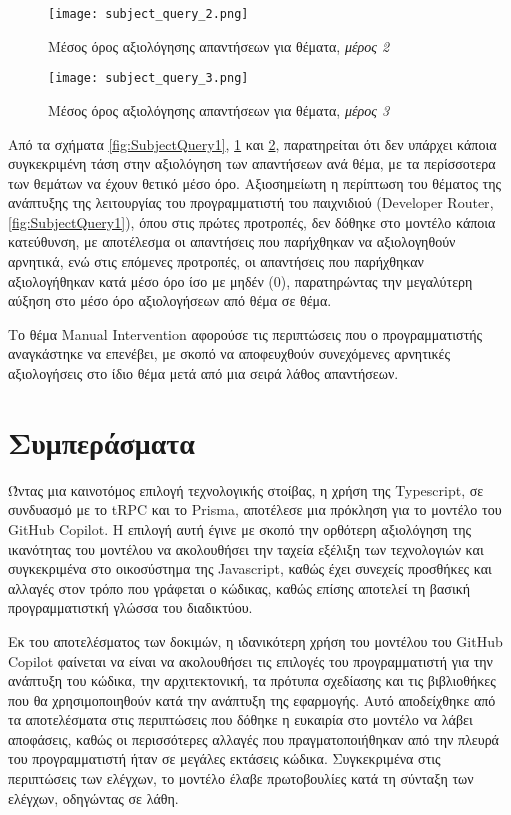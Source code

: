 \begin{figure}[H]
  \begin{center}
    \texttt{[image: subject\_query\_2.png]}
    \caption{Μέσος όρος αξιολόγησης απαντήσεων για θέματα, \textit{μέρος
    2}}
      \label{fig:SubjectQuery2}
  \end{center}
\end{figure}

\begin{figure}[H]
  \begin{center}
    \texttt{[image: subject\_query\_3.png]}
    \caption{Μέσος όρος αξιολόγησης απαντήσεων για θέματα, \textit{μέρος
    3}}
      \label{fig:SubjectQuery3}
  \end{center}
\end{figure}

Από τα σχήματα \ref{fig:SubjectQuery1}, \ref{fig:SubjectQuery2} και
\ref{fig:SubjectQuery3}, παρατηρείται ότι δεν υπάρχει κάποια
συγκεκριμένη τάση στην αξιολόγηση των απαντήσεων ανά θέμα, με τα
περίσσοτερα των θεμάτων να έχουν θετικό μέσο όρο. Αξιοσημείωτη η
περίπτωση του θέματος της ανάπτυξης της λειτουργίας του προγραμματιστή
του παιχνιδιού (\textlatin{Developer Router}, \ref{fig:SubjectQuery1}), όπου στις πρώτες
προτροπές, δεν δόθηκε στο μοντέλο κάποια κατεύθυνση, με αποτέλεσμα οι
απαντήσεις που παρήχθηκαν να αξιολογηθούν αρνητικά, ενώ στις επόμενες
προτροπές, οι απαντήσεις που παρήχθηκαν αξιολογήθηκαν κατά μέσο όρο ίσο
με μηδέν (0), παρατηρώντας την μεγαλύτερη αύξηση στο μέσο όρο
αξιολογήσεων από θέμα σε θέμα.

Το θέμα \textlatin{Manual Intervention} αφορούσε τις περιπτώσεις που ο
προγραμματιστής αναγκάστηκε να επενέβει, με σκοπό να αποφευχθούν
συνεχόμενες αρνητικές αξιολογήσεις στο ίδιο θέμα μετά από μια σειρά
λάθος απαντήσεων.

\section{Συμπεράσματα}

Ώντας μια καινοτόμος επιλογή τεχνολογικής στοίβας, η χρήση της
\textlatin{Typescript}, σε συνδυασμό με το \textlatin{tRPC} και το
\textlatin{Prisma}, αποτέλεσε μια πρόκληση για το μοντέλο του
\textlatin{GitHub Copilot}. Η επιλογή αυτή έγινε με σκοπό την ορθότερη
αξιολόγηση της ικανότητας του μοντέλου να ακολουθήσει την ταχεία εξέλιξη
των τεχνολογιών και συγκεκριμένα στο οικοσύστημα της
\textlatin{Javascript}, καθώς έχει συνεχείς προσθήκες και αλλαγές στον
τρόπο που γράφεται ο κώδικας, καθώς επίσης αποτελεί τη βασική
προγραμματιστκή γλώσσα του διαδικτύου.

Εκ του αποτελέσματος των δοκιμών, η ιδανικότερη χρήση του μοντέλου του \textlatin{GitHub Copilot} φαίνεται να είναι να ακολουθήσει τις επιλογές του προγραμματιστή για την ανάπτυξη του κώδικα, την αρχιτεκτονική, τα πρότυπα σχεδίασης και τις βιβλιοθήκες που θα χρησιμοποιηθούν κατά την ανάπτυξη της εφαρμογής. Αυτό αποδείχθηκε από τα αποτελέσματα στις περιπτώσεις που δόθηκε η ευκαιρία στο μοντέλο να λάβει αποφάσεις, καθώς οι περισσότερες αλλαγές που πραγματοποιήθηκαν από την πλευρά του προγραμματιστή ήταν σε μεγάλες εκτάσεις κώδικα. Συγκεκριμένα στις περιπτώσεις των ελέγχων, το μοντέλο έλαβε πρωτοβουλίες κατά τη σύνταξη των ελέγχων, οδηγώντας σε λάθη.